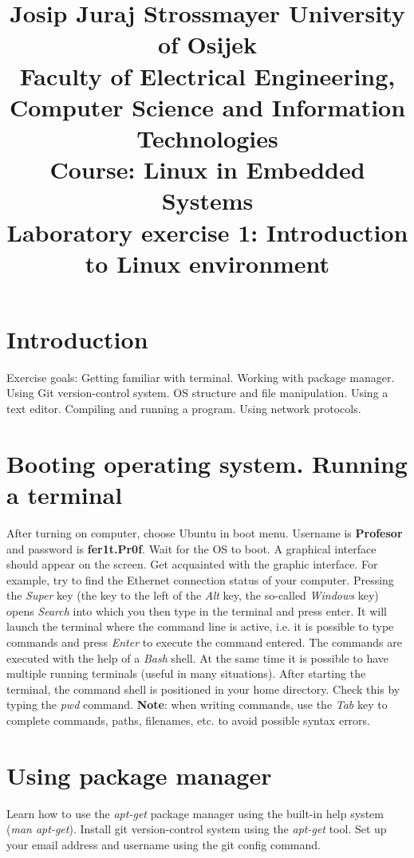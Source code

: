 \documentclass[11pt]{article}
\title{
	\Large Josip Juraj Strossmayer University of Osijek \\
	Faculty of Electrical Engineering, Computer Science and Information
	 Technologies\\
	\vspace{4cm}
	\Large Course: Linux in Embedded Systems \\
	\vspace{4cm}
	\Large \textbf{Laboratory exercise 1: Introduction to Linux environment}
	}
\date{}
\begin{document}
\maketitle
\thispagestyle{empty}
\newpage

\section{Introduction}
Exercise goals: Getting familiar with terminal. Working with package manager.
 Using Git version-control system. OS structure and file manipulation.
 Using a text editor. Compiling and running a program. Using network protocols.

\section{Booting operating system. Running a terminal}
After turning on computer, choose Ubuntu in boot menu. Username is
\textbf{Profesor} and password is \textbf{fer1t.Pr0f}. Wait for the OS to boot.
 A graphical interface should appear on the screen. Get acquainted with the
 graphic interface. For example, try to find the Ethernet connection status
 of your computer.
 \newline
 \newline
 Pressing the \textit{Super} key (the key to the left of the \textit{Alt} key,
 the so-called \textit{Windows} key) opens \textit{Search} into which you then
 type in the terminal and press enter. It will launch the terminal where the
 command line is active, i.e. it is possible to type commands and press
 \textit{Enter} to execute the command entered. The commands are executed with
 the help of a \textit{Bash} shell. At the same time it is possible to have
 multiple running terminals (useful in many situations). After starting the
 terminal, the command shell is positioned in your home directory. Check this
 by typing the \textit{pwd} command.
\newline
\newline
\textbf{Note}: when writing commands, use the \textit{Tab} key to complete
commands, paths, filenames, etc. to avoid possible syntax errors.

\section{Using package manager}
Learn how to use the \textit{apt-get} package manager using the built-in
 help system (\textit{man apt-get}). Install git version-control system using
 the \textit{apt-get} tool. Set up your email address and username
using the git config command.
\end{document}
